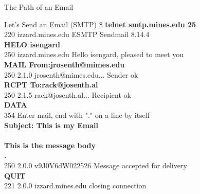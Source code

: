 \documentclass{lug}
\begin{document}
\begin{frame}{The Path of an Email}
\end{frame}

\begin{frame}{Let's Send an Email (SMTP)}
    \ttfamily
    \footnotesize
    \$ \textbf{telnet smtp.mines.edu 25} \\
    220 izzard.mines.edu ESMTP Sendmail 8.14.4 \\
    \pause
    \textbf{HELO isengard} \\
    250 izzard.mines.edu Hello isengard, pleased to meet you \\
    \pause
    \textbf{MAIL From:jrosenth@mimes.edu} \\
    250 2.1.0 jrosenth@mimes.edu... Sender ok \\
    \pause
    \textbf{RCPT To:rack@josenth.al} \\
    250 2.1.5 rack@josenth.al... Recipient ok \\
    \pause
    \textbf{DATA} \\
    354 Enter mail, end with "." on a line by itself \\
    \pause
    \textbf{Subject: This is my Email \\
    \\
    This is the message body \\
    .} \\
    250 2.0.0 v9J0V6dW022526 Message accepted for delivery \\
    \pause
    \textbf{QUIT} \\
    221 2.0.0 izzard.mines.edu closing connection
\end{frame}
\end{document}
